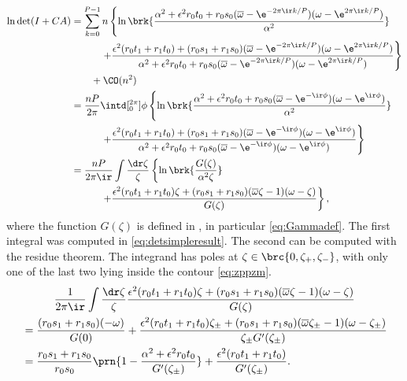 \documentclass[12pt]{article}
\newcommand{\omb}{\overline{\omega}}
\begin{document}
\begin{equation}\label{eq:detrepints}
\begin{aligned}
  \ln\det(I+CA) &=  \sum_{k=0}^{P-1} 
    n \left\{
      \ln\brk{ \frac{\alpha^2+\epsilon^2r_0t_0 + r_0s_0 (\omb-\e^{-2\pi\ir k/P}) (\omega-\e^{2\pi\ir k/P})} {\alpha^2}}
    \right.\\
    &\qquad\quad \left.+
      \frac{ \epsilon^2 (r_0t_1+r_1t_0) + (r_0s_1+r_1s_0) (\omb-\e^{-2\pi\ir k/P}) (\omega-\e^{2\pi\ir k/P})} { \alpha^2+\epsilon^2r_0t_0 + r_0s_0 (\omb-\e^{-2\pi\ir k/P}) (\omega-\e^{2\pi\ir k/P})} 
    \right\}\\
   &\qquad +\CO(n^2)\\
    &= \frac{nP}{2\pi} \intd[_0^{2\pi}]{\phi} \left\{
     \ln\brk{ \frac{\alpha^2+\epsilon^2r_0t_0 + r_0s_0 (\omb-\e^{-\ir\phi}) (\omega-\e^{\ir\phi})} {\alpha^2}}
    \right.\\
    &\qquad\quad \left.+
      \frac{ \epsilon^2 (r_0t_1+r_1t_0) + (r_0s_1+r_1s_0) (\omb-\e^{-\ir\phi}) (\omega-\e^{\ir\phi})} { \alpha^2+\epsilon^2r_0t_0 + r_0s_0 (\omb-\e^{-\ir\phi}) (\omega-\e^{\ir\phi})}
    \right\}\\
    &= \frac{nP}{2\pi\ir} \int \frac{\dr\zeta}{\zeta} \left\{ \ln \brk{\frac{G(\zeta)}{\alpha^2\zeta}}
    \right.\\
    &\qquad\quad \left.+
      \frac{ \epsilon^2 (r_0t_1+r_1t_0)\zeta + (r_0s_1+r_1s_0) (\omb\zeta-1) (\omega-\zeta)} {G(\zeta)}
    \right\},
\end{aligned}
\end{equation}
%
where the function $G(\zeta)$ is defined in , in particular \eqref{eq:Gammadef}.
The first integral was computed in \eqref{eq:detsimpleresult}.
The second can be computed with the residue theorem.
The integrand has poles at $\zeta\in\brc{0,\zeta_+,\zeta_-}$, with only one of the last two lying inside the contour \eqref{eq:zppzm}.
%
\begin{multline}\label{eq:repcontoutint}
  \frac{1}{2\pi\ir} \int \frac{\dr\zeta}{\zeta} 
    \frac{ \epsilon^2 (r_0t_1+r_1t_0)\zeta + (r_0s_1+r_1s_0) (\omb\zeta-1) (\omega-\zeta)} {G(\zeta)} \\
    \begin{aligned}
      &= \frac{(r_0s_1+r_1s_0)(-\omega)}{G(0)}
      + \frac{ \epsilon^2 (r_0t_1+r_1t_0)\zeta_\pm + (r_0s_1+r_1s_0) (\omb\zeta_\pm-1) (\omega-\zeta_\pm)} {\zeta_\pm G'(\zeta_\pm)} \\
      &= \frac{r_0s_1+r_1s_0}{r_0s_0}\prn{1-\frac{\alpha^2+\epsilon^2r_0t_0} {G'(\zeta_\pm)}}
      + \frac{ \epsilon^2 (r_0t_1+r_1t_0)} {G'(\zeta_\pm)} .
    \end{aligned}
\end{multline}
%
\end{document}
